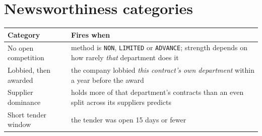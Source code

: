 \documentclass[11pt,a4paper]{article}
\begin{document}
\section*{Newsworthiness categories}
\begin{center}\small
\begin{tabular}{@{}lp{10.6cm}@{}}
\toprule
\textbf{Category} & \textbf{Fires when} \\
\midrule
No open competition   & method is \texttt{NON}, \texttt{LIMITED} or \texttt{ADVANCE}; strength depends on how rarely \emph{that} department does it \\
Lobbied, then awarded & the company lobbied \emph{this contract's own department} within a year before the award \\
Supplier dominance    & holds more of that department's contracts than an even split across its suppliers predicts \\
Short tender window   & the tender was open 15 days or fewer \\
\bottomrule\end{tabular}\end{center}
\clearpage
\end{document}
